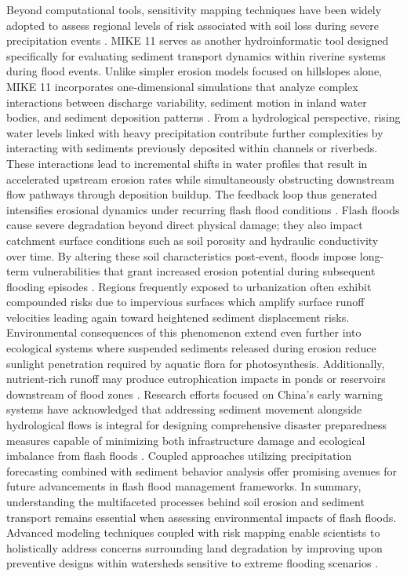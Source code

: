 Beyond computational tools, sensitivity mapping techniques have been widely adopted to assess regional levels of risk associated with soil loss during severe precipitation events \citep{Yang2022}. MIKE 11 serves as another hydroinformatic tool designed specifically for evaluating sediment transport dynamics within riverine systems during flood events. Unlike simpler erosion models focused on hillslopes alone, MIKE 11 incorporates one-dimensional simulations that analyze complex interactions between discharge variability, sediment motion in inland water bodies, and sediment deposition patterns \citep{Beilicci2024}.
From a hydrological perspective, rising water levels linked with heavy precipitation contribute further complexities by interacting with sediments previously deposited within channels or riverbeds. These interactions lead to incremental shifts in water profiles that result in accelerated upstream erosion rates while simultaneously obstructing downstream flow pathways through deposition buildup. The feedback loop thus generated intensifies erosional dynamics under recurring flash flood conditions \citep{Yang2022}.
Flash floods cause severe degradation beyond direct physical damage; they also impact catchment surface conditions such as soil porosity and hydraulic conductivity over time. By altering these soil characteristics post-event, floods impose long-term vulnerabilities that grant increased erosion potential during subsequent flooding episodes \citep{Wang2023}. Regions frequently exposed to urbanization often exhibit compounded risks due to impervious surfaces which amplify surface runoff velocities leading again toward heightened sediment displacement risks.
Environmental consequences of this phenomenon extend even further into ecological systems where suspended sediments released during erosion reduce sunlight penetration required by aquatic flora for photosynthesis. Additionally, nutrient-rich runoff may produce eutrophication impacts in ponds or reservoirs downstream of flood zones \citep{Maqtan2022a}\citep{Georgakakos2022}.
Research efforts focused on China's early warning systems have acknowledged that addressing sediment movement alongside hydrological flows is integral for designing comprehensive disaster preparedness measures capable of minimizing both infrastructure damage and ecological imbalance from flash floods \citep{AlRawas2024}. Coupled approaches utilizing precipitation forecasting combined with sediment behavior analysis offer promising avenues for future advancements in flash flood management frameworks.
In summary, understanding the multifaceted processes behind soil erosion and sediment transport remains essential when assessing environmental impacts of flash floods. Advanced modeling techniques coupled with risk mapping enable scientists to holistically address concerns surrounding land degradation by improving upon preventive designs within watersheds sensitive to extreme flooding scenarios \citep{Yang2022}\citep{Archer2019}.
